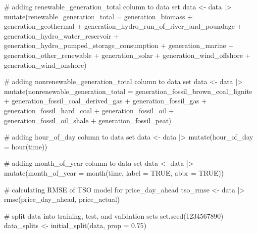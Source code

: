 \documentclass[
]{article}
\newenvironment{Shaded}{\begin{snugshade}}{\end{snugshade}}
\newcommand{\AttributeTok}[1]{\textcolor[rgb]{0.40,0.45,0.13}{#1}}
\newcommand{\CommentTok}[1]{\textcolor[rgb]{0.37,0.37,0.37}{#1}}
\newcommand{\ConstantTok}[1]{\textcolor[rgb]{0.56,0.35,0.01}{#1}}
\newcommand{\DecValTok}[1]{\textcolor[rgb]{0.68,0.00,0.00}{#1}}
\newcommand{\FloatTok}[1]{\textcolor[rgb]{0.68,0.00,0.00}{#1}}
\newcommand{\FunctionTok}[1]{\textcolor[rgb]{0.28,0.35,0.67}{#1}}
\newcommand{\NormalTok}[1]{\textcolor[rgb]{0.00,0.23,0.31}{#1}}
\newcommand{\OtherTok}[1]{\textcolor[rgb]{0.00,0.23,0.31}{#1}}
\newcommand{\SpecialCharTok}[1]{\textcolor[rgb]{0.37,0.37,0.37}{#1}}
\begin{document}
\begin{Shaded}
\begin{Highlighting}[]
\CommentTok{\# adding renewable\_generation\_total column to data set}
\NormalTok{data }\OtherTok{\textless{}{-}}\NormalTok{ data }\SpecialCharTok{|\textgreater{}}
  \FunctionTok{mutate}\NormalTok{(}\AttributeTok{renewable\_generation\_total =}\NormalTok{ generation\_biomass }\SpecialCharTok{+}\NormalTok{ generation\_geothermal }\SpecialCharTok{+}\NormalTok{ generation\_hydro\_run\_of\_river\_and\_poundage }\SpecialCharTok{+}\NormalTok{ generation\_hydro\_water\_reservoir }\SpecialCharTok{+}\NormalTok{ generation\_hydro\_pumped\_storage\_consumption }\SpecialCharTok{+}\NormalTok{ generation\_marine }\SpecialCharTok{+}\NormalTok{ generation\_other\_renewable }\SpecialCharTok{+}\NormalTok{ generation\_solar }\SpecialCharTok{+}\NormalTok{ generation\_wind\_offshore }\SpecialCharTok{+}\NormalTok{ generation\_wind\_onshore)}

\CommentTok{\# adding nonrenewable\_generation\_total column to data set}
\NormalTok{data }\OtherTok{\textless{}{-}}\NormalTok{ data }\SpecialCharTok{|\textgreater{}}
  \FunctionTok{mutate}\NormalTok{(}\AttributeTok{nonrenewable\_generation\_total =}\NormalTok{ generation\_fossil\_brown\_coal\_lignite }\SpecialCharTok{+}\NormalTok{ generation\_fossil\_coal\_derived\_gas }\SpecialCharTok{+}\NormalTok{ generation\_fossil\_gas }\SpecialCharTok{+}\NormalTok{ generation\_fossil\_hard\_coal }\SpecialCharTok{+}\NormalTok{ generation\_fossil\_oil }\SpecialCharTok{+}\NormalTok{ generation\_fossil\_oil\_shale }\SpecialCharTok{+}\NormalTok{ generation\_fossil\_peat)}

\CommentTok{\# adding hour\_of\_day column to data set}
\NormalTok{data }\OtherTok{\textless{}{-}}\NormalTok{ data }\SpecialCharTok{|\textgreater{}}
  \FunctionTok{mutate}\NormalTok{(}\AttributeTok{hour\_of\_day =} \FunctionTok{hour}\NormalTok{(time))}

\CommentTok{\# adding month\_of\_year column to data set}
\NormalTok{data }\OtherTok{\textless{}{-}}\NormalTok{ data }\SpecialCharTok{|\textgreater{}}
  \FunctionTok{mutate}\NormalTok{(}\AttributeTok{month\_of\_year =} \FunctionTok{month}\NormalTok{(time, }\AttributeTok{label =} \ConstantTok{TRUE}\NormalTok{, }\AttributeTok{abbr =} \ConstantTok{TRUE}\NormalTok{))}

\CommentTok{\# calculating RMSE of TSO model for price\_day\_ahead}
\NormalTok{tso\_rmse }\OtherTok{\textless{}{-}}\NormalTok{ data }\SpecialCharTok{|\textgreater{}}
  \FunctionTok{rmse}\NormalTok{(price\_day\_ahead, price\_actual)}

\CommentTok{\# split data into training, test, and validation sets}
\FunctionTok{set.seed}\NormalTok{(}\DecValTok{1234567890}\NormalTok{)}
\NormalTok{data\_splits }\OtherTok{\textless{}{-}} \FunctionTok{initial\_split}\NormalTok{(data, }\AttributeTok{prop =} \FloatTok{0.75}\NormalTok{)}


\end{Highlighting}
\end{Shaded}
\end{document}
